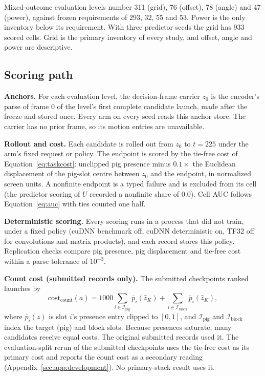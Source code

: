 \begin{revblock}
Mixed-outcome evaluation levels number 311 (grid), 76 (offset), 78 (angle) and 47 (power), against frozen requirements of 293, 32, 55 and 53. Power is the only inventory below its requirement. With three predictor seeds the grid has 933 scored cells. Grid is the primary inventory of every study, and offset, angle and power are descriptive.

\subsection{Scoring path}
\label{sec:app:proto:scoring}

\textbf{Anchors.} For each evaluation level, the decision-frame carrier $z_0$ is the encoder's parse of frame 0 of the level's first complete candidate launch, made after the freeze and stored once. Every arm on every seed reads this anchor store. The carrier has no prior frame, so its motion entries are unavailable.

\textbf{Rollout and cost.} Each candidate is rolled out from $z_0$ to $t=225$ under the arm's fixed request or policy. The endpoint is scored by the tie-free cost of Equation~\ref{eq:taskcost}: unclipped pig presence minus $0.1\times$ the Euclidean displacement of the pig-slot centre between $z_0$ and the endpoint, in normalized screen units. A nonfinite endpoint is a typed failure and is excluded from its cell (the predictor scoring of $U$ recorded a nonfinite share of 0.0). Cell AUC follows Equation~\ref{eq:auc} with ties counted one half.

\textbf{Deterministic scoring.} Every scoring runs in a process that did not train, under a fixed policy (cuDNN benchmark off, cuDNN deterministic on, TF32 off for convolutions and matrix products), and each record stores this policy. Replication checks compare pig presence, pig displacement and tie-free cost within a parse tolerance of $10^{-3}$.

\textbf{Count cost (submitted records only).} The submitted checkpoints ranked launches by
\begin{equation}
\mathrm{cost}_{\mathrm{count}}(a)=1000\sum_{i\in\mathcal{I}_{\mathrm{pig}}}\bar p_i(\hat z_K)+\sum_{i\in\mathcal{I}_{\mathrm{block}}}\bar p_i(\hat z_K),
\label{eq:select}
\end{equation}
where $\bar p_i(z)$ is slot $i$'s presence entry clipped to $[0,1]$, and $\mathcal{I}_{\mathrm{pig}}$ and $\mathcal{I}_{\mathrm{block}}$ index the target (pig) and block slots. Because presences saturate, many candidates receive equal costs. The original submitted records used it. The evaluation-split rerun of the submitted checkpoints uses the tie-free cost as its primary cost and reports the count cost as a secondary reading (Appendix~\ref{sec:app:development}). No primary-stack result uses it.


\end{revblock}
